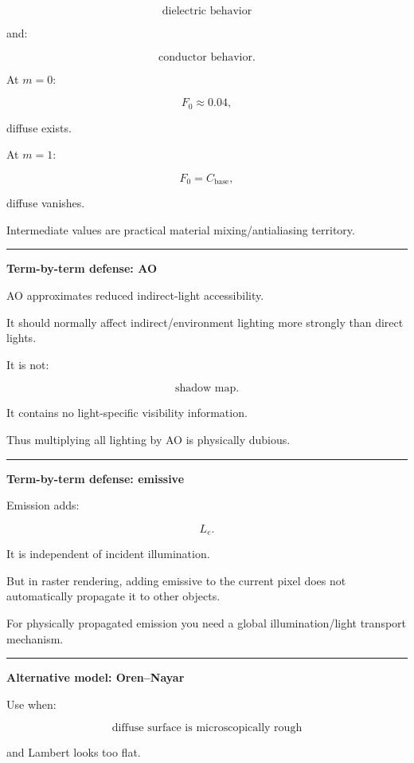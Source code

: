 \[
\text{dielectric behavior}
\]

and:

\[
\text{conductor behavior}.
\]

At \(m=0\):

\[
F_0\approx0.04,
\]

diffuse exists.

At \(m=1\):

\[
F_0=C_{\text{base}},
\]

diffuse vanishes.

Intermediate values are practical material mixing/antialiasing territory.

\begin{center}\rule{0.5\linewidth}{0.5pt}\end{center}

\textbf{Term-by-term defense: AO}

AO approximates reduced indirect-light accessibility.

It should normally affect indirect/environment lighting more strongly than direct lights.

It is not:

\[
\text{shadow map}.
\]

It contains no light-specific visibility information.

Thus multiplying all lighting by AO is physically dubious.

\begin{center}\rule{0.5\linewidth}{0.5pt}\end{center}

\textbf{Term-by-term defense: emissive}

Emission adds:

\[
L_e.
\]

It is independent of incident illumination.

But in raster rendering, adding emissive to the current pixel does not automatically propagate it to other objects.

For physically propagated emission you need a global illumination/light transport mechanism.

\begin{center}\rule{0.5\linewidth}{0.5pt}\end{center}

\textbf{Alternative model: Oren--Nayar}

Use when:

\[
\text{diffuse surface is microscopically rough}
\]

and Lambert looks too flat.


